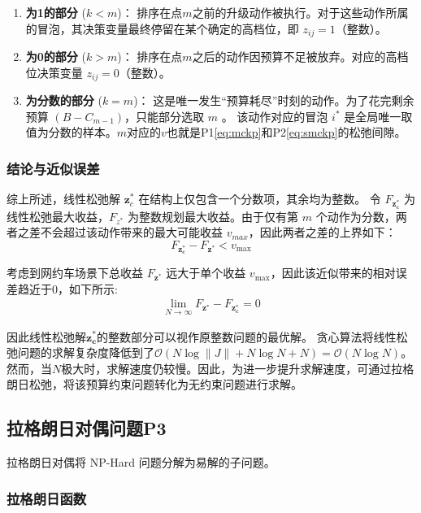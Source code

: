 \begin{enumerate}
    \item \textbf{为1的部分} ($k < m$)：
    排序在点$m$之前的升级动作被执行。对于这些动作所属的冒泡，其决策变量最终停留在某个确定的高档位，即 $z_{ij} = 1$（整数）。

    \item \textbf{为0的部分} ($k > m$)：
    排序在点$m$之后的动作因预算不足被放弃。对应的高档位决策变量 $z_{ij} = 0$（整数）。

    \item \textbf{为分数的部分} ($k = m$)：
    这是唯一发生“预算耗尽”时刻的动作。为了花完剩余预算 $(B - C_{m-1})$，只能部分选取 $m$ 。
    该动作对应的冒泡 $i^*$ 是全局唯一取值为分数的样本。$m$对应的$v$也就是P1\eqref{eq:mckp}和P2\eqref{eq:smckp}的松弛间隙。
\end{enumerate}

\subsubsection{结论与近似误差}
综上所述，线性松弛解 $\bm{z}_c^*$ 在结构上仅包含一个分数项，其余均为整数。
令 $F_{\bm{z_c^*}}$ 为线性松弛最大收益，$F_{z^*}$ 为整数规划最大收益。由于仅有第 $m$ 个动作为分数，两者之差不会超过该动作带来的最大可能收益 $v_{max}$，因此两者之差的上界如下：
\begin{equation}
F_{\bm{z_c^*}} - F_{\bm{z^*}} < v_{\max}
\end{equation}\par
考虑到网约车场景下总收益 $F_{\bm{z^*}}$ 远大于单个收益 $v_{\max}$，因此该近似带来的相对误差趋近于0，如下所示:
\begin{align}
    \lim_{N\to \infty} F_{\bm{z^{*}}} - F_{\bm{z^*_c}} = 0
\end{align}

因此线性松弛解$\bm{z_c^*}$的整数部分可以视作原整数问题的最优解。
贪心算法将线性松弛问题的求解复杂度降低到了$\mathcal{O}\left(N\log \|J\| + N \log N +N \right) = \mathcal O (N\log N)$。
然而，当$N$极大时，求解速度仍较慢。因此，为进一步提升求解速度，可通过拉格朗日松弛，将该预算约束问题转化为无约束问题进行求解。



\subsection{拉格朗日对偶问题P3}

拉格朗日对偶将 NP-Hard 问题分解为易解的子问题。

\subsubsection{拉格朗日函数}

